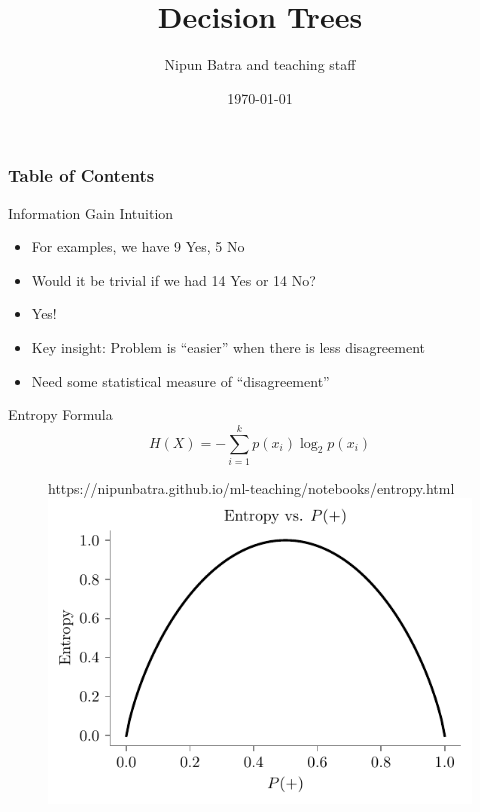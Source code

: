 \documentclass[usenames,dvipsnames]{beamer}
\title{Decision Trees}
\date{\today}
\author{Nipun Batra and teaching staff}
\institute{IIT Gandhinagar}
\begin{document}
	\maketitle
	
	\begin{frame}
	\frametitle{Table of Contents}
	\tableofcontents
	\end{frame}

\begin{frame}{Information Gain Intuition}
\begin{itemize}
\item For examples, we have 9 Yes, 5 No
	\pause \item Would it be trivial if we had 14 Yes or 14 No?
	\pause \item Yes!
	\pause \item Key insight: Problem is ``easier'' when there is less disagreement
	\pause 	\item Need some statistical measure of ``disagreement'' 
\end{itemize}
\end{frame}

\begin{frame}{Entropy Formula}
$$H(X) = -\sum_{i=1}^k p(x_i) \log_2 p(x_i)$$

\begin{figure}[htp]
    \centering
    \begin{notebookbox}{https://nipunbatra.github.io/ml-teaching/notebooks/entropy.html}
      \includegraphics[scale=0.6]{../assets/decision-trees/figures/entropy.pdf}
    \end{notebookbox}
  \end{figure}

\end{frame}
	
\end{document}
